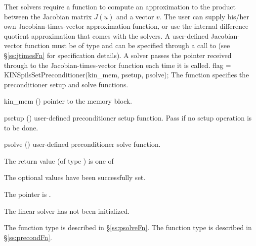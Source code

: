 Ther {\kinspils} solvers require a function to compute an approximation to the
product between the Jacobian matrix $J(u)$ and a vector $v$.
The user can supply his/her own Jacobian-times-vector approximation function, 
or use the internal difference quotient approximation
that comes with the {\kinspils} solvers.  A user-defined Jacobian-vector
function must be of type  and 
can be specified through a call to  
(see \S\ref{ss:jtimesFn} for specification details).
A {\kinspils} solver passes the pointer  received through 
 to the Jacobian-times-vector function 
each time it is called.  
{
  flag = KINSpilsSetPreconditioner(kin\_mem, psetup, psolve);
}
{
  The function  specifies the preconditioner
  setup and solve functions.
}
{
  \begin{args}
  \item[kin\_mem] ()
    pointer to the {\kinsol} memory block.
  \item[psetup] ()
    user-defined preconditioner setup function.  Pass  if no setup
    operation is to be done.
  \item[psolve] ()
    user-defined preconditioner solve function.
  \end{args}
}
{
  The return value  (of type ) is one of
  \begin{args}
  \item[\Id{KINSPILS\_SUCCESS}] 
    The optional values have been successfully set.
  \item[\Id{KINSPILS\_MEM\_NULL}]
    The  pointer is .
  \item[\Id{KINSPILS\_LMEM\_NULL}]
    The {\kinspils} linear solver has not been initialized.
  \end{args}
}
{
   The function type  is described in \S\ref{ss:psolveFn}.
   The function type  is described in \S\ref{ss:precondFn}.
}
